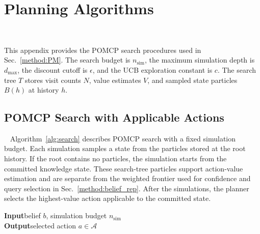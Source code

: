 \section{Planning Algorithms}~\label{appx:algorithms}

This appendix provides the POMCP search procedures used in Sec.~\ref{method:PM}. The search budget is $n_{\mathrm{sim}}$, the maximum simulation depth is $d_{\max}$, the discount cutoff is $\epsilon$, and the UCB exploration constant is $c$. The search tree $T$ stores visit counts $N$, value estimates $V$, and sampled state particles $B(h)$ at history $h$.

\normalem
\subsection{POMCP Search with Applicable Actions}~\label{appx:alg_search}
Algorithm~\ref{alg:search} describes POMCP search with a fixed simulation budget. Each simulation samples a state from the particles stored at the root history. If the root contains no particles, the simulation starts from the committed knowledge state. These search-tree particles support action-value estimation and are separate from the weighted frontier used for confidence and query selection in Sec.~\ref{method:belief_rep}.  After the simulations, the planner selects the highest-value action applicable to the committed state.

\begin{algorithm}[H]
\caption{POMCP Search with Applicable Actions}
\label{alg:search}
\textbf{Input}\quad belief $b$, simulation budget $n_{\mathrm{sim}}$ \\
\textbf{Output}\quad selected action $a \in \mathcal{A}$
\BlankLine

\end{algorithm}

